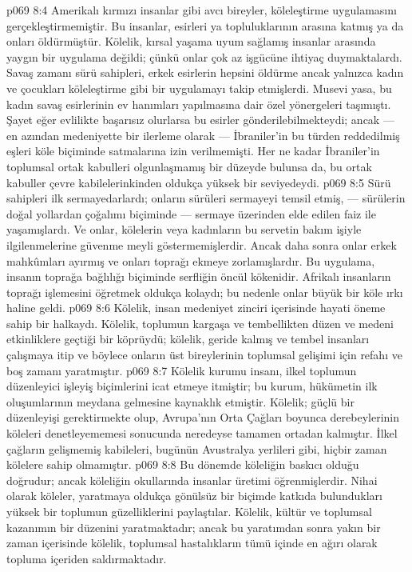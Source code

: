 \vs p069 8:4 Amerikalı kırmızı insanlar gibi avcı bireyler, köleleştirme uygulamasını gerçekleştirmemiştir. Bu insanlar, esirleri ya topluluklarının arasına katmış ya da onları öldürmüştür. Kölelik, kırsal yaşama uyum sağlamış insanlar arasında yaygın bir uygulama değildi; çünkü onlar çok az işgücüne ihtiyaç duymaktalardı. Savaş zamanı sürü sahipleri, erkek esirlerin hepsini öldürme ancak yalnızca kadın ve çocukları köleleştirme gibi bir uygulamayı takip etmişlerdi. Musevi yasa, bu kadın savaş esirlerinin ev hanımları yapılmasına dair özel yönergeleri taşımıştı. Şayet eğer evlilikte başarısız olurlarsa bu esirler gönderilebilmekteydi; ancak --- en azından medeniyette bir ilerleme olarak --- İbraniler’in bu türden reddedilmiş eşleri köle biçiminde satmalarına izin verilmemişti. Her ne kadar İbraniler’in toplumsal ortak kabulleri olgunlaşmamış bir düzeyde bulunsa da, bu ortak kabuller çevre kabilelerinkinden oldukça yüksek bir seviyedeydi.
\vs p069 8:5 Sürü sahipleri ilk sermayedarlardı; onların sürüleri sermayeyi temsil etmiş, --- sürülerin doğal yollardan çoğalımı biçiminde --- sermaye üzerinden elde edilen faiz ile yaşamışlardı. Ve onlar, kölelerin veya kadınların bu servetin bakım işiyle ilgilenmelerine güvenme meyli göstermemişlerdir. Ancak daha sonra onlar erkek mahkûmları ayırmış ve onları toprağı ekmeye zorlamışlardır. Bu uygulama, insanın toprağa bağlılığı biçiminde serfliğin öncül kökenidir. Afrikalı insanların toprağı işlemesini öğretmek oldukça kolaydı; bu nedenle onlar büyük bir köle ırkı haline geldi.
\vs p069 8:6 Kölelik, insan medeniyet zinciri içerisinde hayati öneme sahip bir halkaydı. Kölelik, toplumun kargaşa ve tembellikten düzen ve medeni etkinliklere geçtiği bir köprüydü; kölelik, geride kalmış ve tembel insanları çalışmaya itip ve böylece onların üst bireylerinin toplumsal gelişimi için refahı ve boş zamanı yaratmıştır.
\vs p069 8:7 Kölelik kurumu insanı, ilkel toplumun düzenleyici işleyiş biçimlerini icat etmeye itmiştir; bu kurum, hükümetin ilk oluşumlarının meydana gelmesine kaynaklık etmiştir. Kölelik; güçlü bir düzenleyişi gerektirmekte olup, Avrupa’nın Orta Çağları boyunca derebeylerinin köleleri denetleyememesi sonucunda neredeyse tamamen ortadan kalmıştır. İlkel çağların gelişmemiş kabileleri, bugünün Avustralya yerlileri gibi, hiçbir zaman kölelere sahip olmamıştır.
\vs p069 8:8 Bu dönemde köleliğin baskıcı olduğu doğrudur; ancak köleliğin okullarında insanlar üretimi öğrenmişlerdir. Nihai olarak köleler, yaratmaya oldukça gönülsüz bir biçimde katkıda bulundukları yüksek bir toplumun güzelliklerini paylaştılar. Kölelik, kültür ve toplumsal kazanımın bir düzenini yaratmaktadır; ancak bu yaratımdan sonra yakın bir zaman içerisinde kölelik, toplumsal hastalıkların tümü içinde en ağırı olarak topluma içeriden saldırmaktadır.
